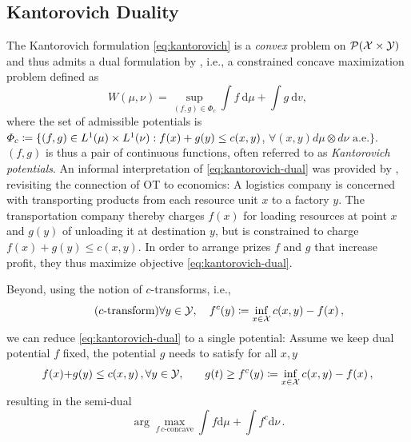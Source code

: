 \subsection{Kantorovich Duality} \label{sec:background_dual}

The Kantorovich formulation \eqref{eq:kantorovich} is a \emph{convex} problem on ${\mathcal{P}}(\mathcal{X} \times \mathcal{Y})$ and thus admits a dual formulation by \citet{kantorovich1942transfer}, i.e., a constrained concave maximization problem defined as
\begin{equation} \label{eq:kantorovich-dual}
    W(\mu, \nu)=\sup _{(f, g) \in \Phi_{c}} \int f \mathrm{~d} \mu+\int g \mathrm{~d} v,
\end{equation}
 where the set of admissible potentials is $\Phi_c \coloneqq \{(f, g) \in L^{1}(\mu) \times L^{1}(\nu): f(x)+g(y) \leq c(x,y)$, $\forall(x, y) d\mu \otimes d\nu \text{ a.e.}\}$.
$(f, g)$ is thus a pair of continuous functions, often referred to as \emph{Kantorovich potentials}.
An informal interpretation of \eqref{eq:kantorovich-dual} was provided by \citet{caffarelli2003monge}, revisiting the connection of \acrshort{OT} to economics: 
A logistics company is concerned with transporting products from each resource unit $x$ to a factory $y$. The transportation company thereby charges $f(x)$ for loading resources at point $x$ and $g(y)$ of unloading it at destination $y$, but is constrained to charge $f(x)+g(y) \le c(x,y)$. In order to arrange prizes $f$ and $g$ that increase profit, they thus maximize objective \eqref{eq:kantorovich-dual}.

Beyond, using the notion of $c$-transforms, i.e.,
\begin{equation}
	\tag{$c$-transform}
	\forall y \in \mathcal{Y}, \quad f^c(y) \coloneqq \inf _{x \in \mathcal{X}} c(x, y)-f(x) \,,
\end{equation}
we can reduce \eqref{eq:kantorovich-dual} to a single potential: Assume we keep dual potential $f$ fixed, the potential $g$ needs to satisfy for all $x, y$
\begin{align*}
	f(x) + &g(y) \le c(x, y)\,,
	\forall y \in \mathcal{Y}, \quad  &g(t) \ge f^c(y) \coloneqq \inf _{x \in \mathcal{X}} c(x, y) - f(x)\,,
\end{align*}
resulting in the semi-dual
\begin{equation}\label{eq:semi-dual}
\arg\!\!\max_{f\, c\text{-concave}} \int f \textrm{d}\mu + \int f^c\textrm{d}\nu\,.
\end{equation}

